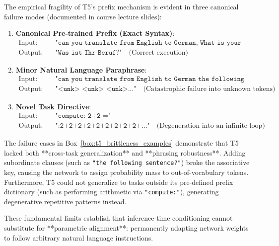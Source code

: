 \documentclass[../../../main.tex]{subfiles}
\begin{document}
\begin{tcolorbox}[colback=cardBg,colframe=cardLine,arc=2pt,boxrule=0.5pt,title=\textbf{Pedagogical Example: T5 Prompt Brittleness and Format Fragility}]
\label{box:t5_brittleness_examples}
The empirical fragility of T5's prefix mechanism is evident in three canonical failure modes (documented in course lecture slides):
\begin{enumerate}
    \item \textbf{Canonical Pre-trained Prefix (Exact Syntax)}:
    \begin{align*}
    \text{Input:} & \quad \texttt{"can you translate from English to German, What is your profession?"} \\
    \text{Output:} & \quad \texttt{"Was ist Ihr Beruf?"} \quad \text{(Correct execution)}
    \end{align*}
    \item \textbf{Minor Natural Language Paraphrase}:
    \begin{align*}
    \text{Input:} & \quad \texttt{"can you translate from English to German the following sentence? What is your profession?"} \\
    \text{Output:} & \quad \texttt{"<unk> <unk> <unk>..."} \quad \text{(Catastrophic failure into unknown tokens)}
    \end{align*}
    \item \textbf{Novel Task Directive}:
    \begin{align*}
    \text{Input:} & \quad \texttt{"compute: 2+2 ="} \\
    \text{Output:} & \quad \texttt{":2+2+2+2+2+2+2+2+2+..."} \quad \text{(Degeneration into an infinite loop)}
    \end{align*}
\end{enumerate}
\end{tcolorbox}

The failure cases in Box~\ref{box:t5_brittleness_examples} demonstrate that T5 lacked both **cross-task generalization** and **phrasing robustness**. Adding subordinate clauses (such as \texttt{"the following sentence?"}) broke the associative key, causing the network to assign probability mass to out-of-vocabulary tokens. Furthermore, T5 could not generalize to tasks outside its pre-defined prefix dictionary (such as performing arithmetic via \texttt{"compute:"}), generating degenerative repetitive patterns instead.

These fundamental limits establish that inference-time conditioning cannot substitute for **parametric alignment**: permanently adapting network weights to follow arbitrary natural language instructions.
\end{document}
